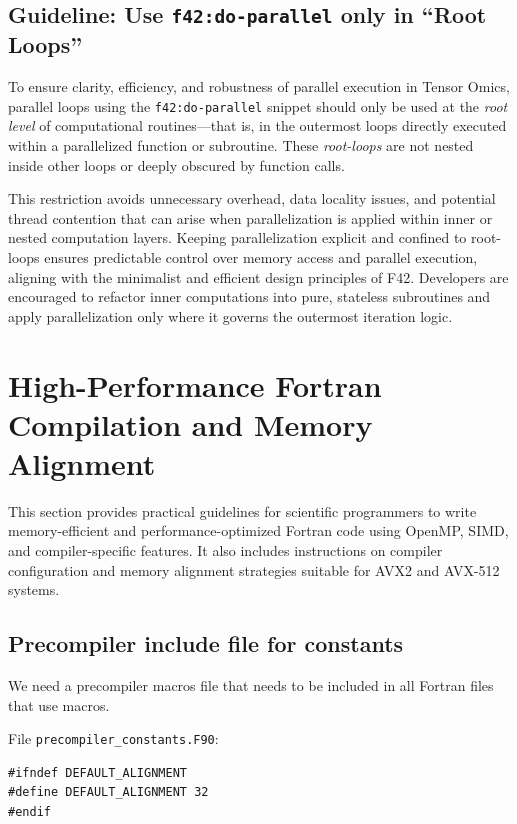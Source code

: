 \documentclass{article}
\begin{document}
\subsection{Guideline: Use \texttt{f42:do-parallel} only in ``Root Loops''}

To ensure clarity, efficiency, and robustness of parallel execution in Tensor
Omics, parallel loops using the \texttt{f42:do-parallel} snippet should only be
used at the \emph{root level} of computational routines—that is, in the
outermost loops directly executed within a parallelized function or subroutine.
These \emph{root-loops} are not nested inside other loops or deeply obscured by
function calls.

This restriction avoids unnecessary overhead, data locality issues, and
potential thread contention that can arise when parallelization is applied
within inner or nested computation layers. Keeping parallelization explicit and
confined to root-loops ensures predictable control over memory access and
parallel execution, aligning with the minimalist and efficient design
principles of F42. Developers are encouraged to refactor inner computations
into pure, stateless subroutines and apply parallelization only where it
governs the outermost iteration logic.


\section{High-Performance Fortran Compilation and Memory Alignment}

This section provides practical guidelines for scientific programmers to write memory-efficient and performance-optimized Fortran code using OpenMP, SIMD, and compiler-specific features. It also includes instructions on compiler configuration and memory alignment strategies suitable for AVX2 and AVX-512 systems.

\subsection{Precompiler include file for constants}

We need a precompiler macros file that needs to be included in all Fortran
files that use macros.

\vspace{1em}%
\noindent{}File \texttt{precompiler\_constants.F90}:
\begin{verbatim}
#ifndef DEFAULT_ALIGNMENT
#define DEFAULT_ALIGNMENT 32
#endif
\end{verbatim}
\end{document}
